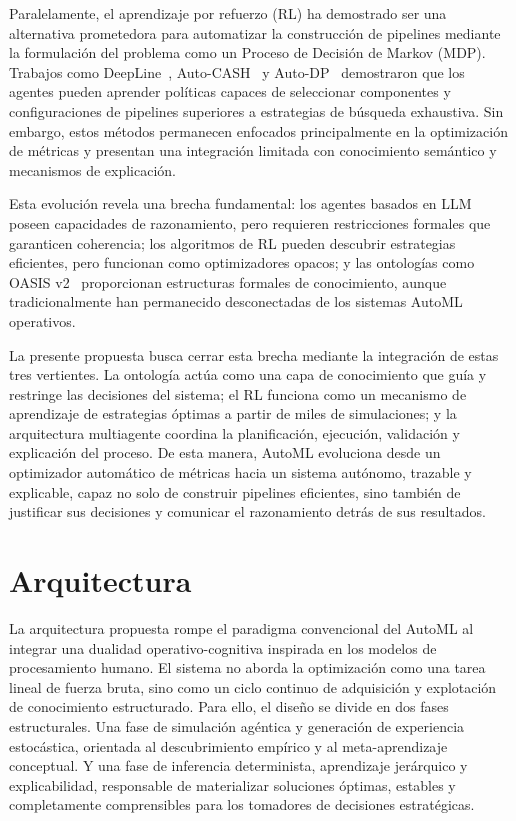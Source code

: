 \documentclass[conference]{IEEEtran}
\begin{document}
Paralelamente, el aprendizaje por refuerzo (RL) ha demostrado ser una alternativa prometedora para automatizar la construcción de pipelines mediante la formulación del problema como un Proceso de Decisión de Markov (MDP). Trabajos como DeepLine~\cite{heffetz2020}, Auto-CASH~\cite{mu2022} y Auto-DP~\cite{zhang2026automating} demostraron que los agentes pueden aprender políticas capaces de seleccionar componentes y configuraciones de pipelines superiores a estrategias de búsqueda exhaustiva. Sin embargo, estos métodos permanecen enfocados principalmente en la optimización de métricas y presentan una integración limitada con conocimiento semántico y mecanismos de explicación.

Esta evolución revela una brecha fundamental: los agentes basados en LLM poseen capacidades de razonamiento, pero requieren restricciones formales que garanticen coherencia; los algoritmos de RL pueden descubrir estrategias eficientes, pero funcionan como optimizadores opacos; y las ontologías como OASIS v2~\cite{bella2024} proporcionan estructuras formales de conocimiento, aunque tradicionalmente han permanecido desconectadas de los sistemas AutoML operativos.

La presente propuesta busca cerrar esta brecha mediante la integración de estas tres vertientes. La ontología actúa como una capa de conocimiento que guía y restringe las decisiones del sistema; el RL funciona como un mecanismo de aprendizaje de estrategias óptimas a partir de miles de simulaciones; y la arquitectura multiagente coordina la planificación, ejecución, validación y explicación del proceso. De esta manera, AutoML evoluciona desde un optimizador automático de métricas hacia un sistema autónomo, trazable y explicable, capaz no solo de construir pipelines eficientes, sino también de justificar sus decisiones y comunicar el razonamiento detrás de sus resultados.

\section{Arquitectura}

La arquitectura propuesta rompe el paradigma convencional del AutoML al integrar una dualidad operativo-cognitiva inspirada en los modelos de procesamiento humano. El sistema no aborda la optimización como una tarea lineal de fuerza bruta, sino como un ciclo continuo de adquisición y explotación de conocimiento estructurado. Para ello, el diseño se divide en dos fases estructurales. Una fase de simulación agéntica y generación de experiencia estocástica, orientada al descubrimiento empírico y al meta-aprendizaje conceptual. Y una fase de inferencia determinista, aprendizaje jerárquico y explicabilidad, responsable de materializar soluciones óptimas, estables y completamente comprensibles para los tomadores de decisiones estratégicas.
\end{document}
